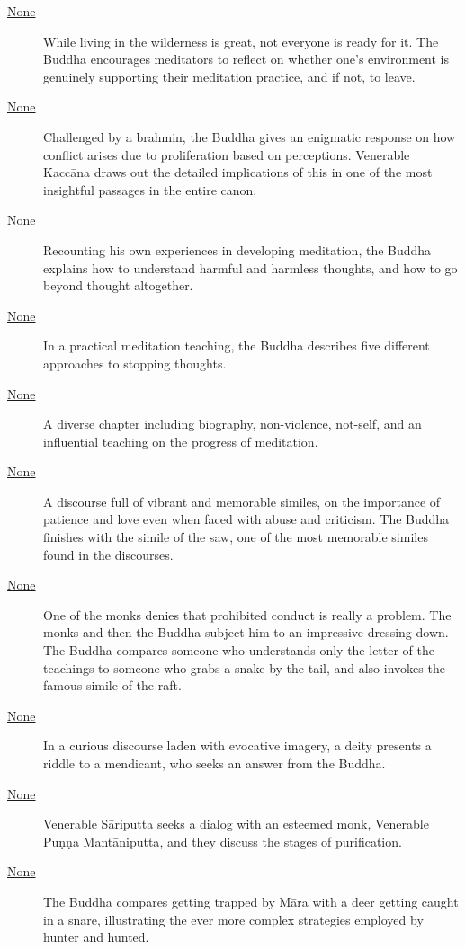 \documentclass[12pt,openany]{book}%
\begin{document}
\begin{description}
\item[\href{\#mn17}{None}] While living in the wilderness is great, not everyone is ready for it. The Buddha encourages meditators to reflect on whether one’s environment is genuinely supporting their meditation practice, and if not, to leave.%
\item[\href{\#mn18}{None}] Challenged by a brahmin, the Buddha gives an enigmatic response on how conflict arises due to proliferation based on perceptions. Venerable \textsanskrit{Kaccāna} draws out the detailed implications of this in one of the most insightful passages in the entire canon.%
\item[\href{\#mn19}{None}] Recounting his own experiences in developing meditation, the Buddha explains how to understand harmful and harmless thoughts, and how to go beyond thought altogether.%
\item[\href{\#mn20}{None}] In a practical meditation teaching, the Buddha describes five different approaches to stopping thoughts.%
\item[\href{\#mn{-}opammavagga}{None}] A diverse chapter including biography, non-violence, not-self, and an influential teaching on the progress of meditation.%
\item[\href{\#mn21}{None}] A discourse full of vibrant and memorable similes, on the importance of patience and love even when faced with abuse and criticism. The Buddha finishes with the simile of the saw, one of the most memorable similes found in the discourses.%
\item[\href{\#mn22}{None}] One of the monks denies that prohibited conduct is really a problem. The monks and then the Buddha subject him to an impressive dressing down. The Buddha compares someone who understands only the letter of the teachings to someone who grabs a snake by the tail, and also invokes the famous simile of the raft.%
\item[\href{\#mn23}{None}] In a curious discourse laden with evocative imagery, a deity presents a riddle to a mendicant, who seeks an answer from the Buddha.%
\item[\href{\#mn24}{None}] Venerable \textsanskrit{Sāriputta} seeks a dialog with an esteemed monk, Venerable \textsanskrit{Puṇṇa} \textsanskrit{Mantāniputta}, and they discuss the stages of purification.%
\item[\href{\#mn25}{None}] The Buddha compares getting trapped by \textsanskrit{Māra} with a deer getting caught in a snare, illustrating the ever more complex strategies employed by hunter and hunted.%

\end{description}
\end{document}
